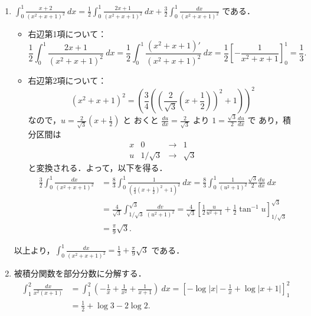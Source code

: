 \documentclass[11pt, uplatex, dvipdfmx]{jsarticle}
\newcommand{\ds}{\displaystyle}
\begin{document}
\begin{enumerate}[(1)]
   \item $\ds \int_{0}^{1} \frac{x+2}{(x^2+x+1)^2} \ dx 
     = \frac{1}{2} \int_{0}^{1} \frac{2x+1}{(x^2+x+1)^2} \ dx + \frac{3}{2} \int_{0}^{1} \frac{dx}{(x^2+x+1)^2}$ である．

     \vspace{.1in}

     \begin{itemize}
       \setlength{\itemsep}{.1in}
       
     \item 右辺第1項について：
       \[
         \frac{1}{2}\int_{0}^{1}\frac{2x+1}{(x^2+x+1)^2} \ dx =\frac{1}{2}\int_{0}^{1}
       \frac{(x^2+x+1)'}{(x^2+x+1)^2} \ dx = \frac{1}{2}\left[ -\frac{1}{x^2+x+1}
       \right]_{0}^{1} = \frac{1}{3}.
     \]
       
     \item 右辺第2項について：
       \[
         \left(x^2+x+1\right)^2 
         = \left( \frac{3}{4}\left( \left(\frac{2}{\sqrt{3}}\left( x+ \frac{1}{2} \right) \right)^2 + 1 \right) \right)^2
       \]
       なので，$u= \frac{2}{\sqrt{3}}\left(x+\frac{1}{2}\right)$ と
       おくと $\frac{du}{dx} =
       \frac{2}{\sqrt{3}}$ より $1=\frac{\sqrt{3}}{2} \frac{du}{dx}$ で
       あり，積分区間は
       \[
         \begin{array}{c|ccc}
           x & 0 & \to & 1 \\ \hline
           u & 1/\sqrt{3} & \to & \sqrt{3}
         \end{array}
       \]
       と変換される．よって，以下を得る．
       \[
         \begin{aligned}
           \frac{3}{2} \int_{0}^{1} \frac{dx}{\left( x^2+x+1\right)^2} &=
           \frac{8}{3} \int_{0}^{1} \frac{1}{\left( \frac{4}{3} \left( x + \frac{1}{2}\right)^2 + 1\right)^2} \ dx
           = \frac{8}{3} \int_{0}^{1} \frac{1}{(u^2+1)^2} \frac{\sqrt{3}}{2} \frac{du}{dx} \ dx\\
           &=\frac{4}{\sqrt{3}} \int_{1/\sqrt{3}}^{\sqrt{3}} \frac{dv}{(u^2+1)^2}
           = \frac{4}{\sqrt{3}} \left[ \frac{1}{2}\frac{u}{u^2+1} 
             + \frac{1}{2} \tan^{-1} u \right]_{1/\sqrt{3}}^{\sqrt{3}} \\
           &= \frac{\pi}{9}\sqrt{3}.
         \end{aligned}
       \]
     \end{itemize}
     以上より，$\ds \int_{0}^{1} \frac{dx}{(x^2+x+1)^2} = \frac{1}{3} + \frac{\pi}{9}\sqrt{3}$ である．


   \item 被積分関数を部分分数に分解する．
     \begin{align*}
       \int_{1}^{2} \frac{dx}{x^2(x+1)} 
       &= \int_{1}^{2} \left(-\frac{1}{x} + \frac{1}{x^2} + \frac{1}{x+1}\right) \ dx
       = \left[ - \log|x| -\frac{1}{x} + \log|x+1|\right]_{1}^{2}\\
       &= \frac{1}{2} + \log 3 - 2 \log 2.
     \end{align*}


\end{enumerate}
\end{document}
